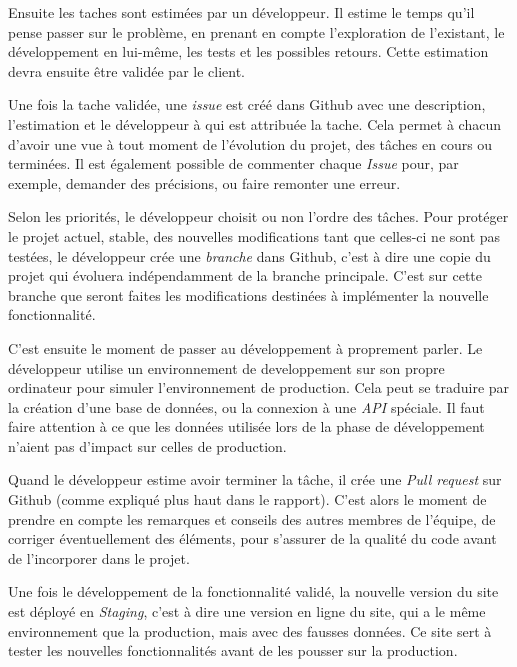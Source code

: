\bigskip

Ensuite les taches sont estimées par un développeur. Il estime le temps
qu'il pense passer sur le problème, en prenant en compte l'exploration
de l'existant, le développement en lui-même, les tests et les possibles
retours. Cette estimation devra ensuite être validée par le client.

\bigskip

Une fois la tache validée, une \emph{issue} est créé dans Github avec
une description, l'estimation et le développeur à qui est attribuée la
tache. Cela permet à chacun d'avoir une vue à tout moment de l'évolution
du projet, des tâches en cours ou terminées. Il est également possible
de commenter chaque \emph{Issue} pour, par exemple, demander des
précisions, ou faire remonter une erreur.

\bigskip

Selon les priorités, le développeur choisit ou non l'ordre des tâches.
Pour protéger le projet actuel, stable, des nouvelles modifications tant
que celles-ci ne sont pas testées, le développeur crée une
\emph{branche} dans Github, c'est à dire une copie du projet qui
évoluera indépendamment de la branche principale. C'est sur cette
branche que seront faites les modifications destinées à implémenter la
nouvelle fonctionnalité.

\bigskip

C'est ensuite le moment de passer au développement à proprement parler.
Le développeur utilise un environnement de developpement sur son propre
ordinateur pour simuler l'environnement de production. Cela peut se
traduire par la création d'une base de données, ou la connexion à une
\emph{API} spéciale. Il faut faire attention à ce que les données
utilisée lors de la phase de développement n'aient pas d'impact sur
celles de production.

\bigskip

Quand le développeur estime avoir terminer la tâche, il crée une
\emph{Pull request} sur Github (comme expliqué plus haut dans le
rapport). C'est alors le moment de prendre en compte les remarques et
conseils des autres membres de l'équipe, de corriger éventuellement des
éléments, pour s'assurer de la qualité du code avant de l'incorporer
dans le projet.

\bigskip

Une fois le développement de la fonctionnalité validé, la nouvelle
version du site est déployé en \emph{Staging}, c'est à dire une version
en ligne du site, qui a le même environnement que la production, mais
avec des fausses données. Ce site sert à tester les nouvelles
fonctionnalités avant de les pousser sur la production.

